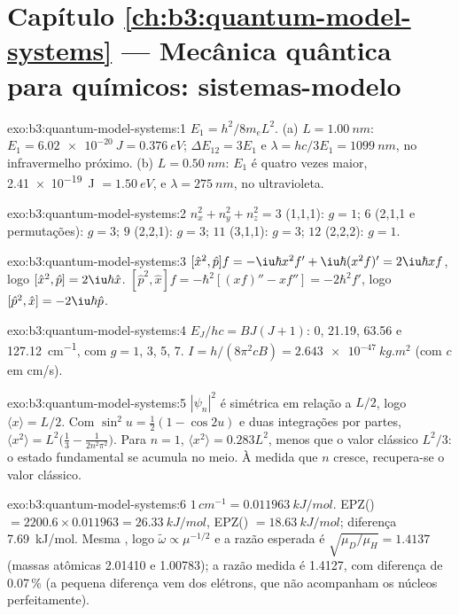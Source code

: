 \section*{Capítulo \ref{ch:b3:quantum-model-systems} --- Mecânica quântica para químicos: sistemas-modelo}

\begin{solution}{exo:b3:quantum-model-systems:1}
$E_1 = h^2/8m_eL^2$. (a) $L = \qty{1.00}{nm}$: $E_1 = \qty{6.02e-20}{J} =
\qty{0.376}{eV}$; $\Delta E_{12} = 3E_1$ e $\lambda = hc/3E_1 =
\qty{1099}{nm}$, no infravermelho próximo. (b) $L = \qty{0.50}{nm}$: $E_1$ é quatro
vezes maior, \qty{2.41e-19}{J} $= \qty{1.50}{eV}$, e $\lambda =
\qty{275}{nm}$, no ultravioleta.
\end{solution}

\begin{solution}{exo:b3:quantum-model-systems:2}
$n_x^2 + n_y^2 + n_z^2 = 3$ (1,1,1): $g = 1$; $6$ (2,1,1 e permutações):
$g = 3$; $9$ (2,2,1): $g = 3$; $11$ (3,1,1): $g = 3$; $12$ (2,2,2): $g = 1$.
\end{solution}

\begin{solution}{exo:b3:quantum-model-systems:3}
$[\hat x^2,\hat p]f = -\iu\hbar x^2f' + \iu\hbar(x^2f)' = 2\iu\hbar xf$, logo
$[\hat x^2,\hat p] = 2\iu\hbar\hat x$. $[\hat p^2,\hat x]f = -\hbar^2[(xf)'' -
xf''] = -2\hbar^2f'$, logo $[\hat p^2,\hat x] = -2\iu\hbar\hat p$.
\end{solution}

\begin{solution}{exo:b3:quantum-model-systems:4}
$E_J/hc = BJ(J+1)$: 0, 21.19, 63.56 e \qty{127.12}{cm^{-1}}, com $g = 1$,
3, 5, 7. $I = h/(8\pi^2cB) = \qty{2.643e-47}{kg.m^2}$ (com $c$ em
\unit{cm/s}).
\end{solution}

\begin{solution}{exo:b3:quantum-model-systems:5}
$|\psi_n|^2$ é simétrica em relação a $L/2$, logo $\langle x\rangle = L/2$. Com
$\sin^2u = \frac12(1 - \cos2u)$ e duas integrações por partes,
$\langle x^2\rangle = L^2\big(\frac13 - \frac{1}{2n^2\pi^2}\big)$. Para $n = 1$,
$\langle x^2\rangle = 0.283L^2$, menos que o valor clássico $L^2/3$: o estado
fundamental se acumula no meio. À medida que $n$ cresce, recupera-se o valor clássico.
\end{solution}

\begin{solution}{exo:b3:quantum-model-systems:6}
$1\,\unit{cm^{-1}} = \qty{0.011963}{kJ/mol}$. EPZ() $= 2200.6 \times
0.011963 = \qty{26.33}{kJ/mol}$, EPZ() $= \qty{18.63}{kJ/mol}$; diferença
\qty{7.69}{kJ/mol}. Mesma , logo $\tilde\omega \propto \mu^{-1/2}$
e a razão esperada é $\sqrt{\mu_D/\mu_H} = 1.4137$ (massas atômicas
2.01410 e 1.00783); a razão medida é 1.4127, com diferença de 0.07\,\% (a
pequena diferença vem dos elétrons, que não acompanham os núcleos
perfeitamente).
\end{solution}

